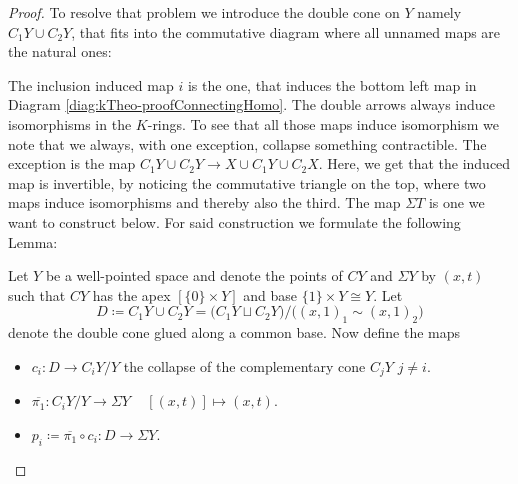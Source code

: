 \begin{proof}
	To resolve that problem we introduce the double cone on $Y$ namely $C_1Y\cup C_2Y$, that fits into the commutative diagram where all unnamed maps are the natural ones:
	\begin{center}
	\end{center} The inclusion induced map $i$ is the one, that induces the bottom left map in Diagram \ref{diag:kTheo-proofConnectingHomo}. The double arrows always induce isomorphisms in the $K$-rings. To see that all those maps induce isomorphism we note that we always, with one exception, collapse something contractible. The exception is the map $C_1Y\cup C_2Y \to X \cup C_1Y \cup C_2X$. Here, we get that the induced map is invertible, by noticing the commutative triangle on the top, where two maps induce isomorphisms and thereby also the third. The map $\Sigma T$ is one we want to construct below.  For said construction we formulate the following Lemma: 
	\begin{lemma}\label{lem:kTheo-doubleConeFlip}
		Let $Y$ be a well-pointed space and denote the points of $CY$ and $\Sigma Y$ by $(x,t)$ such that $CY$ has the apex $[\{0\}\times Y]$ and base $\{1\}\times Y\cong Y$. Let 
		\begin{equation*}
			D\coloneq C_1Y \cup C_2Y = \big(C_1Y \sqcup C_2 Y\big) \Big/ \big((x,1)_1\sim (x,1)_2\big)
		\end{equation*} denote the double cone glued along a common base. Now define the maps
		\begin{itemize}
			\item $c_i:D \to C_i Y \big/Y$ the collapse of the complementary cone $C_jY$ $j\neq i$.
			\item $\overline{\pi_1}:C_iY\big/Y \to \Sigma Y\,\quad [(x,t)]\mapsto (x,t)$.
			\item $p_i\coloneq \overline{\pi_1}\circ c_i: D\to \Sigma Y$.

\end{itemize}
\end{lemma}
\end{proof}
